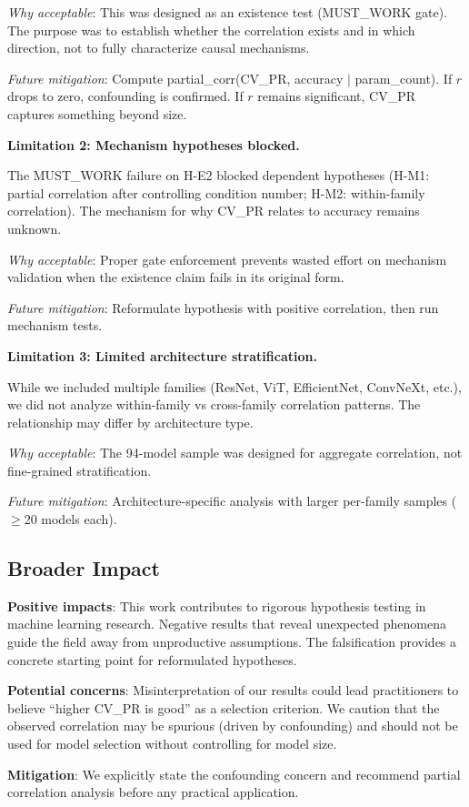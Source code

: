 \emph{Why acceptable}: This was designed as an existence test (MUST\_WORK gate). The purpose was to establish whether the correlation exists and in which direction, not to fully characterize causal mechanisms.

\emph{Future mitigation}: Compute partial\_corr(CV\_PR, accuracy $|$ param\_count). If $r$ drops to zero, confounding is confirmed. If $r$ remains significant, CV\_PR captures something beyond size.

\textbf{Limitation 2: Mechanism hypotheses blocked.}

The MUST\_WORK failure on H-E2 blocked dependent hypotheses (H-M1: partial correlation after controlling condition number; H-M2: within-family correlation). The mechanism for why CV\_PR relates to accuracy remains unknown.

\emph{Why acceptable}: Proper gate enforcement prevents wasted effort on mechanism validation when the existence claim fails in its original form.

\emph{Future mitigation}: Reformulate hypothesis with positive correlation, then run mechanism tests.

\textbf{Limitation 3: Limited architecture stratification.}

While we included multiple families (ResNet, ViT, EfficientNet, ConvNeXt, etc.), we did not analyze within-family vs cross-family correlation patterns. The relationship may differ by architecture type.

\emph{Why acceptable}: The 94-model sample was designed for aggregate correlation, not fine-grained stratification.

\emph{Future mitigation}: Architecture-specific analysis with larger per-family samples ($\geq$20 models each).

\subsection{Broader Impact}

\textbf{Positive impacts}: This work contributes to rigorous hypothesis testing in machine learning research. Negative results that reveal unexpected phenomena guide the field away from unproductive assumptions. The falsification provides a concrete starting point for reformulated hypotheses.

\textbf{Potential concerns}: Misinterpretation of our results could lead practitioners to believe ``higher CV\_PR is good'' as a selection criterion. We caution that the observed correlation may be spurious (driven by confounding) and should not be used for model selection without controlling for model size.

\textbf{Mitigation}: We explicitly state the confounding concern and recommend partial correlation analysis before any practical application.
